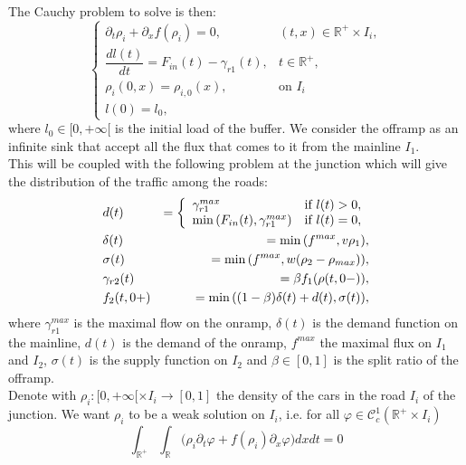 \documentclass[12pt,subeqn]{article}
\numberwithin{equation}{section}
\newcommand{\R}{\mathbb R}
\newcommand{\CC}{{\mathcal C}}
\newcommand{\del}{\partial}
\newcommand{\be}{\begin{equation}}
\newcommand{\ee}{\end{equation}}
\begin{document}
The Cauchy problem to solve is then:
\be
	\label{eq:CP}
		\left\{
		\begin{array}{ll}
		\del_t \rho_i + \del_x f(\rho_i) =0, & (t,x)\in\R^+\times I_i, \\
		\dfrac{dl(t)}{dt}=F_{in}(t)-\gamma_{r1} (t), & t\in\R^+ ,\\
		\rho_i(0,x)=\rho_{i,0}(x), & \text{on } I_i \\
		l(0)=l_0,
		\end{array}
		\right.
\ee
where $l_0 \in [0,+\infty[$ is the initial load of the buffer. 
We consider the offramp as an infinite sink that accept all the flux that comes to it from the mainline $I_1$.\\
This will be coupled with the following problem at the junction which will give the distribution of the traffic among the roads:\\
 \begin{eqnarray}
 	\label{eq:JunctionProblem}
		&d(t)&=\left\{
			 \begin{array}{ll}
			 \gamma^{max}_{r1} &\hbox{if}~l(t)>0 , \\ 
			 \min{(F_{in}(t),\gamma_{r1}^{max})} &\hbox{if}~l(t)=0,
			 \end{array}
			 \right.\\ \nonumber
		&\delta(t)&=\min{(f^{max},v\rho_1)},	 \\ \nonumber
		&\sigma(t)&=\min{(f^{max},w(\rho_2 - \rho_{max}))},\\ \nonumber
		&\gamma_{r2}(t)&=\beta f_{1}(\rho(t,0-)),	\\ \nonumber	
		&f_{2}(t,0+)&=\min{((1-\beta)\delta(t)+d(t), \sigma(t))},
\end{eqnarray}
where $\gamma_{r1}^{max}$ is the maximal flow on the onramp, $\delta(t)$ is the demand function on the mainline, $d(t)$ is the demand of the onramp, $f^{max}$ the maximal flux on $I_1$ and $I_2$, $\sigma(t)$ is the supply function on $I_2$ and $\beta \in [0,1]$ is the split ratio of the offramp.\\ 
Denote with $\rho_i:[0, +\infty[\times I_i \rightarrow [0,1]$ the density of the cars in the road $I_i$ of the junction. We want $\rho_i$ to be a weak solution on $I_i$, i.e. for all $\varphi \in \CC^1_c(\R^+ \times I_i)$
\be
	\int_{\R^+}\int_{\R}\Big( \rho_i \del_t\varphi +f(\rho_i)\del_x\varphi \Big)dxdt=0
	\label{eq:weakSolRhoi}
\ee
\end{document}
